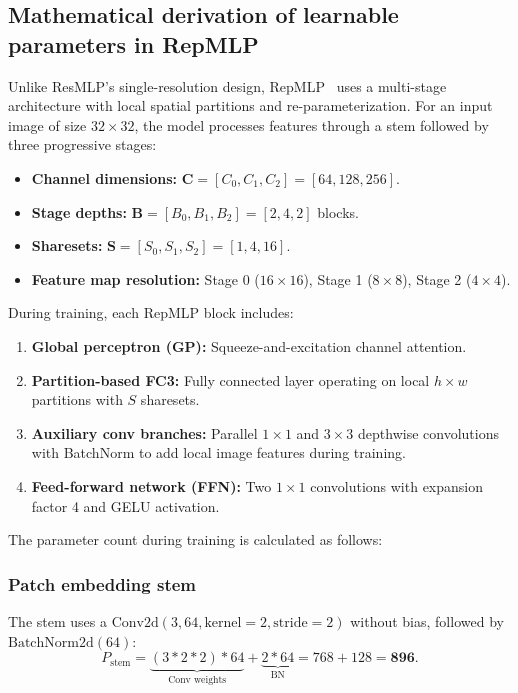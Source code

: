 \subsection{Mathematical derivation of learnable parameters in RepMLP}
\label{subsec:repmlp_param_derivation}
Unlike ResMLP's single-resolution design, RepMLP~\cite{ding2022repmlp} uses a multi-stage architecture with local spatial partitions and re-parameterization. For an input image of size $32 \times 32$, the model processes features through a stem followed by three progressive stages:
\begin{itemize}[leftmargin=1.5em]
    \item \textbf{Channel dimensions:} $\mathbf{C} = [C_0, C_1, C_2] = [64, 128, 256]$.
    \item \textbf{Stage depths:} $\mathbf{B} = [B_0, B_1, B_2] = [2, 4, 2]$ blocks.
    \item \textbf{Sharesets:} $\mathbf{S} = [S_0, S_1, S_2] = [1, 4, 16]$.
    \item \textbf{Feature map resolution:} Stage 0 ($16 \times 16$), Stage 1 ($8 \times 8$), Stage 2 ($4 \times 4$).
\end{itemize}

During training, each RepMLP block includes:
\begin{enumerate}[label=(\alph*)]
    \item \textbf{Global perceptron (GP):} Squeeze-and-excitation channel attention.
    \item \textbf{Partition-based FC3:} Fully connected layer operating on local $h \times w$ partitions with $S$ sharesets.
    \item \textbf{Auxiliary conv branches:} Parallel $1 \times 1$ and $3 \times 3$ depthwise convolutions with BatchNorm to add local image features during training.
    \item \textbf{Feed-forward network (FFN):} Two $1 \times 1$ convolutions with expansion factor 4 and GELU activation.
\end{enumerate}

The parameter count during training is calculated as follows:

\subsubsection{Patch embedding stem}
The stem uses a $\text{Conv2d}(3, 64, \text{kernel}=2, \text{stride}=2)$ without bias, followed by $\text{BatchNorm2d}(64)$:
\begin{equation}
    P_{\text{stem}} = \underbrace{(3 * 2 * 2) * 64}_{\text{Conv weights}} + \underbrace{2 * 64}_{\text{BN}} = 768 + 128 = \mathbf{896}.
\end{equation}

